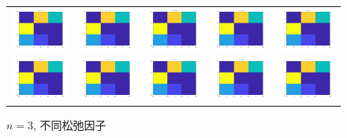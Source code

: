 \documentclass[UTF8,10.5pt,a4paper]{ctexart}
\theoremstyle{definition}
\theoremstyle{definition}
\begin{document}
\begin{figure}[htbp]
	\renewcommand{\captionfont}{\small}
	\centering
	\begin{tabular}{@{}ccccc@{}}
		\includegraphics[width=.18\textwidth]{alpha1n3.jpg} & 
		\includegraphics[width=.18\textwidth]{alpha2n3.jpg} & 
		\includegraphics[width=.18\textwidth]{alpha3n3.jpg} & 
		\includegraphics[width=.18\textwidth]{alpha4n3.jpg} & 
		\includegraphics[width=.18\textwidth]{alpha5n3.jpg}\\
		\includegraphics[width=.18\textwidth]{alpha6n3.jpg} & 
		\includegraphics[width=.18\textwidth]{alpha7n3.jpg} &
		\includegraphics[width=.18\textwidth]{alpha8n3.jpg} & 
		\includegraphics[width=.18\textwidth]{alpha9n3.jpg} & 
		\includegraphics[width=.18\textwidth]{alpha10n3.jpg}
	\end{tabular}
	\caption{$n=3$, 不同松弛因子}
	\label{alphan3figure}
\end{figure}
\end{document}
